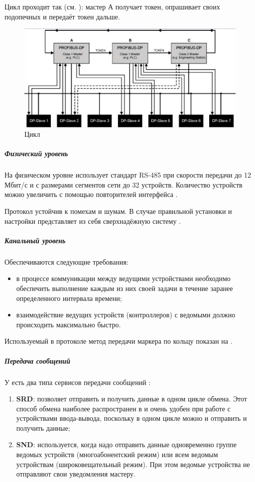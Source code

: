 Цикл проходит так (см. ): мастер А получает токен, опрашивает своих подопечных и передаёт токен дальше. 

\begin{figure}
	\centering
	\includegraphics[width=0.9\linewidth]{images/profibus_token}
	\caption{Цикл \pb}
	\label{fig:profibustoken}
\end{figure}

\subparagraph{Физический уровень}
На физическом уровне \pb использует стандарт RS-485 при скорости передачи до 12 Мбит/с и с размерами сегментов сети до 32 устройств. Количество устройств можно увеличить с помощью повторителей интерфейса \cite{powell_profibus_2013}.

Протокол устойчив к помехам и шумам. В случае правильной установки и настройки представляет из себя сверхнадёжную систему \cite{powell_profibus_2013}.

\subparagraph{Канальный уровень}
Обеспечиваются следующие требования:
\begin{itemize}
	\item в процессе коммуникации между ведущими устройствами необходимо обеспечить выполнение каждым из них своей задачи в течение заранее определенного интервала времени;
	\item взаимодействие ведущих устройств (контроллеров) с ведомыми должно происходить максимально быстро.
\end{itemize}

Используемый в протоколе метод передачи маркера по кольцу показан на .
\subparagraph{Передача сообщений}
У \pb есть два типа сервисов передачи сообщений \cite{__2015}:
\begin{enumerate}
	\item \textbf{SRD}: позволяет отправить и получить данные в одном цикле обмена. Этот способ обмена наиболее распространен в \pb и очень удобен при работе с устройствами ввода-вывода, поскольку в одном цикле можно и отправить и получить данные;
	\item \textbf{SND}: используется, когда надо отправить данные одновременно группе ведомых устройств (многоабонентский режим) или всем ведомым устройствам (широковещательный режим). При этом ведомые устройства не отправляют свои уведомления мастеру.
\end{enumerate}

